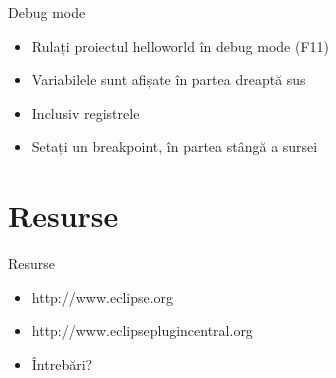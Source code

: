 \documentclass{beamer}
\begin{document}
\begin{frame}{Debug mode}
  \begin{itemize}
  \item Rulați proiectul helloworld în debug mode (F11) 
  \pause
  \item Variabilele sunt afișate în partea dreaptă sus
  \pause
  \item Inclusiv registrele 
  \pause
  \item Setați un breakpoint, în partea stângă a sursei 
  \end{itemize}
\end{frame}

\section{Resurse}

\begin{frame}{Resurse}
  \begin{itemize}
  \item http://www.eclipse.org
  \pause
  \item http://www.eclipseplugincentral.org  
  \pause
  \vspace{10mm}
  \item Întrebări?
  \end{itemize}
\end{frame}

\begin{frame}{}
\end{frame}
\end{document}
